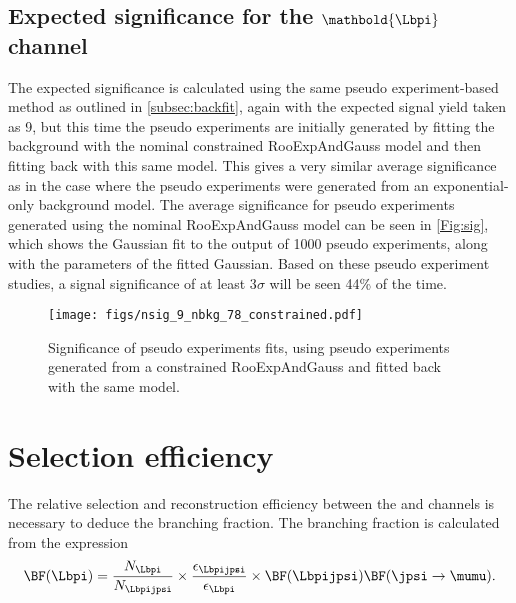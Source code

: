 \subsection[Expected significance for the $\Lbpi$ channel]{Expected significance for the $\mathbold{\Lbpi}$ channel}
\label{subsec:exp}
The expected significance is calculated using the same pseudo  experiment-based method as outlined in \autoref{subsec:backfit}, again with the expected signal yield taken as 9, but this time the pseudo experiments are initially generated by fitting the background with the nominal constrained  RooExpAndGauss model and then fitting back with this same model. This gives a very similar average significance as in the case where the pseudo experiments were generated from an exponential-only background model. The average significance for pseudo experiments generated using the nominal RooExpAndGauss model can be seen in \autoref{Fig:sig}, which shows the Gaussian fit to the output of 1000 pseudo experiments,  along with the parameters of the fitted Gaussian. Based on these pseudo experiment studies, a signal significance of at least 3$\sigma$ will be seen 44\% of the time. %

 \begin{figure}[h!]
  \def\nh{0.7\textwidth}
  \centering
  \texttt{[image: figs/nsig\_9\_nbkg\_78\_constrained.pdf]}
  \caption{Significance of pseudo experiments fits, using pseudo experiments generated from a constrained RooExpAndGauss and fitted back with the same model.}
  \label{Fig:sig}
 \end{figure}

 


 
\section{Selection efficiency}\label{Sec:Eff}
\label{sec:eff}
The relative selection and reconstruction efficiency between the \Lbpi and \Lbpijpsi channels is necessary to deduce the \Lbpi branching fraction. The branching fraction is calculated from the expression
\begin{equation}
  \BF(\Lbpi) = \frac{N_{\Lbpi}}{N_{\Lbpijpsi}}\times\frac{\epsilon_{\Lbpijpsi}}{\epsilon_{\Lbpi}}\times \BF(\Lbpijpsi)\BF(\jpsi\to\mumu). 
  \label{eq:norm2}
  \end{equation}

